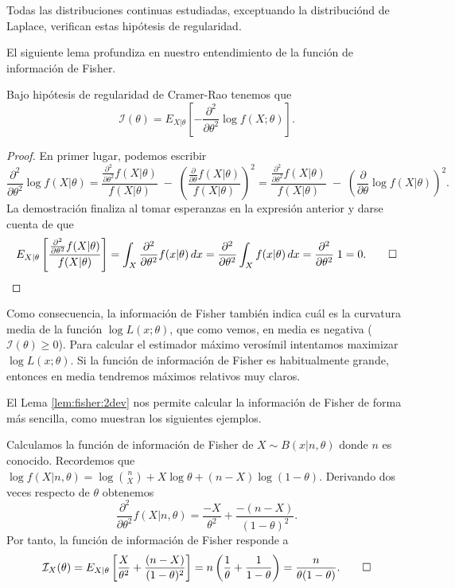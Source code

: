     Todas las distribuciones continuas estudiadas, exceptuando la distribuciónd de Laplace, verifican estas hipótesis de regularidad.

    El siguiente lema profundiza en nuestro entendimiento de la función de información de Fisher.

    \begin{lem} \label{lem:fisher:2dev}
        Bajo hipótesis de regularidad de Cramer-Rao tenemos que
        \[\mathcal{I}(\theta) = E_{X|\theta} \left[-\frac{\partial^2}{\partial\theta^2} \log f(X;\theta) \right].\]
    \end{lem}
    \begin{proof}
        En primer lugar, podemos escribir
        \[\frac{\partial^2}{\partial\theta^2} \log f(X|\theta)=\frac{\frac{\partial^2}{\partial\theta^2} f(X|\theta)}{f(X| \theta)}\;-\;\left( \frac{\frac{\partial}{\partial\theta} f(X|\theta)}{f(X| \theta)} \right)^2=\frac{\frac{\partial^2}{\partial\theta^2} f(X|\theta)}{f(X| \theta)}\;-\;\left( \frac{\partial}{\partial\theta} \log f(X|\theta)\right)^2.\]
        La demostración finaliza al tomar esperanzas en la expresión anterior y darse cuenta de que
        \[E_{X|\theta}\left[\frac{\frac{\partial^2}{\partial\theta^2} f(X|\theta)}{f(X| \theta)}\right] = \int_X \frac{\partial^2}{\partial\theta^2} f(x | \theta)\, dx = \frac{\partial^2}{\partial\theta^2} \int_X f(x | \theta)\, dx = \frac{\partial^2}{\partial\theta^2} \; 1 = 0. \qedhere\]
    \end{proof}

    Como consecuencia, la información de Fisher también indica cuál es la curvatura media de la función $\log L(x; \theta)$, que como vemos, en media es negativa ($\mathcal{I}(\theta) \ge 0$). Para calcular el estimador máximo verosímil intentamos maximizar $\log L(x; \theta)$. Si la función de información de Fisher es habitualmente grande, entonces en media tendremos máximos relativos muy claros.

    El Lema \ref{lem:fisher:2dev} nos permite calcular la información de Fisher de forma más sencilla, como muestran los siguientes ejemplos.

    \begin{ex} \label{ex:fisher:binom}
        Calculamos la función de información de Fisher de $X \sim B(x | n, \theta)$ donde $n$ es conocido. Recordemos que $\log f(X | n, \theta) = \log \binom{n}{X} + X \log \theta + (n - X) \log (1 - \theta)$. Derivando dos veces respecto de $\theta$ obtenemos
        \[\frac{\partial^2}{\partial \theta^2} f(X | n, \theta) = \frac{-X}{\theta^2} + \frac{-(n-X)}{(1 - \theta)^2}.\]
        Por tanto, la función de información de Fisher responde a
        \[\mathcal{I}_X(\theta) =  E_{X|\theta} \left[\frac{X}{\theta^2} + \frac{(n-X)}{(1 - \theta)^2}\right] = n \left(\frac{1}{\theta} + \frac{1}{1 - \theta}\right) = \frac{n}{\theta (1 - \theta)}. \qedhere\]
    \end{ex}

